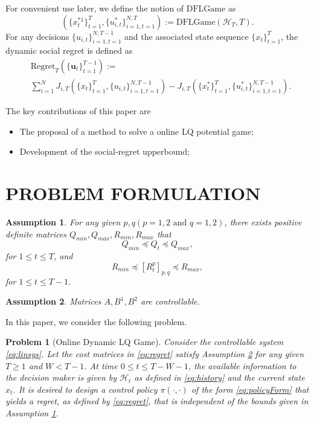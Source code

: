 \documentclass{article}
\newcommand{\usequence}[2]{\{u_{i,t}\}_{i=1,t=1}^{#1,#2}}
\newtheorem{problem}{Problem}
\newtheorem{assumption}{Assumption}
\begin{document}
For convenient use later, we define the notion of $\text{DFLGame}$ as
\begin{equation}\label{eq:regret}
 (\{x_{t}^{*1}\}_{t=1}^{T}, \{u_{i,t}^{*}\}_{i=1,t=1}^{N,T}) := \text{DFLGame}(\mathcal{H}_{T},T).
\end{equation}
For any decisions $\usequence{N}{T-1}$ and the associated state sequence $\{x_{t}\}_{t=1}^{T}$, the dynamic social regret is defined as
\begin{equation}
    \begin{split}
        &\text{Regret}_{T}(\{\mathbf{u}_{t}\}_{t=1}^{T-1}) := \\
        &\sum_{i=1}^{N} J_{i,T}(\{x_{t}\}_{t=1}^{T},\{u_{i,t}\}_{i=1,t=1}^{N,T-1}) - J_{i,T}(\{x_{t}^{*}\}_{t=1}^{T},\{u_{i,t}^{*}\}_{i=1,t=1}^{N,T-1}).
    \end{split}
\end{equation}


The key contributions of this paper are
\begin{itemize}
    \item The proposal of a method to solve a online LQ potential game;
    \item Development of the social-regret upperbound;
\end{itemize}


\section{PROBLEM FORMULATION}
\begin{assumption}\label{assumption:bounds}
    For any given $p,q(p={1,2}\text{ and }q={1,2})$, there exists positive definite matrices $Q_{min}, Q_{max}, R_{min}, R_{max}$ that
    \begin{equation}
        Q_{min} \preceq Q_{t} \preceq Q_{max},
    \end{equation}
    for $1\leq t \leq T$, and
    \begin{equation}
        R_{min} \preceq [R_{t}^{p}]_{p,q} \preceq R_{max},
    \end{equation}
    for $1 \leq t \leq T-1$.
\end{assumption}

\begin{assumption}\label{assumption:controllable}
    Matrices $A,B^{1},B^{2}$ are controllable.
\end{assumption}
In this paper, we consider the following problem.
\begin{problem}[Online Dynamic LQ Game]
     Consider the controllable system \eqref{eq:linsys}. Let the cost matrices in \eqref{eq:regret} satisfy Assumption \ref{assumption:controllable} for any given $T \geq 1$ and $W < T-1$. At time $0 \leq t \leq T-W-1$, the available information to the decision maker is given by $\mathcal{H}_{t}$ as defined in \eqref{eq:history} and the current state $x_{t}$. It is desired to design a control policy $\pi(\cdot, \cdot)$ of the form \eqref{eq:policyForm} that yields a regret, as defined by \eqref{eq:regret}, that is independent of the bounds given in Assumption \ref{assumption:bounds}.
\end{problem}
\end{document}

